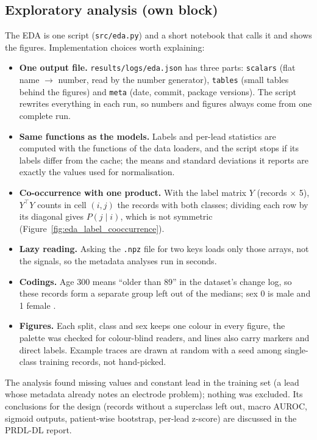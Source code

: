\subsection{Exploratory analysis (own block)}

The EDA is one script (\texttt{src/eda.py}) and a short notebook that calls it and shows the figures.
Implementation choices worth explaining:
\begin{itemize}[leftmargin=1.2em,itemsep=1pt]
  \item \textbf{One output file.} \texttt{results/logs/eda.json} has three parts: \texttt{scalars}
        (flat name $\to$ number, read by the number generator), \texttt{tables} (small tables behind the
        figures) and \texttt{meta} (date, commit, package versions). The script rewrites everything in
        each run, so numbers and figures always come from one complete run.
  \item \textbf{Same functions as the models.} Labels and per-lead statistics are computed with the
        functions of the data loaders, and the script stops if its labels differ from the cache; the
        means and standard deviations it reports are exactly the values used for normalisation.
  \item \textbf{Co-occurrence with one product.} With the label matrix $Y$ (records $\times$ 5), $Y^\top Y$
        counts in cell $(i,j)$ the records with both classes; dividing each row by its diagonal gives
        $P(j \mid i)$, which is not symmetric (Figure~\ref{fig:eda_label_cooccurrence}).
  \item \textbf{Lazy reading.} Asking the \texttt{.npz} file for two keys loads only those arrays, not the
        signals, so the metadata analyses run in seconds.
  \item \textbf{Codings.} Age 300 means ``older than 89'' in the dataset's change log, so these records
        form a separate group left out of the medians; sex 0 is male and 1 female
        \cite[p.~6]{wagner2020ptbxl}.
  \item \textbf{Figures.} Each split, class and sex keeps one colour in every figure, the palette was
        checked for colour-blind readers, and lines also carry markers and direct labels. Example traces
        are drawn at random with a seed among single-class training records, not hand-picked.
\end{itemize}



The analysis found \edaNNanValuesTrain{} missing values and \edaNFlatLeadsTrain{} constant lead in the
training set (a lead whose metadata already notes an electrode problem); nothing was excluded. Its
conclusions for the design (records without a superclass left out, macro AUROC, sigmoid outputs,
patient-wise bootstrap, per-lead z-score) are discussed in the PRDL-DL report.
